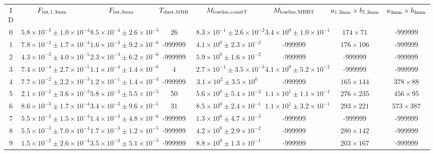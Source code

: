 \begin{table}
\begin{tabular}{cccccccc}
ID & $F_{\rm int, 1.3mm}$ & $F_{\rm int, 3mm}$ & $T_{\rm dust, MBB}$ & $M_{\rm lowlim, constT}$ & $M_{\rm lowlim, MBBT}$ & $a_{\rm 1.3mm}\times b_{\rm 1.3mm}$ & $a_{\rm 3mm}\times b_{\rm 3mm}$ \\
0 & $5.8\times10^{-3}\pm 1.0\times10^{-4}$ & $8.5\times10^{-4}\pm 2.6\times10^{-5}$ & 26 & $8.3\times10^{-1}\pm 2.6\times10^{-2}$ & $3.4\times10^{0}\pm 1.0\times10^{-1}$ & $174\times 71$ & -999999 \\
1 & $7.8\times10^{-3}\pm 1.7\times10^{-4}$ & $1.6\times10^{-3}\pm 9.2\times10^{-6}$ & -999999 & $4.1\times10^{0}\pm 2.3\times10^{-2}$ & -999999 & $176\times 106$ & -999999 \\
2 & $4.3\times10^{-3}\pm 4.0\times10^{-5}$ & $2.3\times10^{-3}\pm 6.2\times10^{-6}$ & -999999 & $5.9\times10^{0}\pm 1.6\times10^{-2}$ & -999999 & -999999 & -999999 \\
3 & $7.4\times10^{-4}\pm 2.7\times10^{-5}$ & $1.1\times10^{-4}\pm 1.4\times10^{-6}$ & 4 & $2.7\times10^{-1}\pm 3.5\times10^{-3}$ & $4.1\times10^{0}\pm 5.2\times10^{-2}$ & -999999 & -999999 \\
4 & $7.7\times10^{-2}\pm 2.2\times10^{-3}$ & $1.2\times10^{-1}\pm 1.4\times10^{-3}$ & -999999 & $3.1\times10^{2}\pm 3.5\times10^{0}$ & -999999 & $165\times 144$ & $378\times 88$ \\
5 & $2.1\times10^{-2}\pm 3.6\times10^{-3}$ & $5.8\times10^{-3}\pm 5.5\times10^{-5}$ & 50 & $5.6\times10^{0}\pm 5.4\times10^{-2}$ & $1.1\times10^{1}\pm 1.1\times10^{-1}$ & $276\times 235$ & $456\times 95$ \\
6 & $8.6\times10^{-3}\pm 1.7\times10^{-4}$ & $3.4\times10^{-3}\pm 9.6\times10^{-5}$ & 31 & $8.5\times10^{0}\pm 2.4\times10^{-1}$ & $1.1\times10^{1}\pm 3.2\times10^{-1}$ & $293\times 221$ & $573\times 387$ \\
7 & $5.5\times10^{-3}\pm 1.5\times10^{-4}$ & $1.4\times10^{-3}\pm 4.8\times10^{-6}$ & -999999 & $1.3\times10^{0}\pm 4.7\times10^{-3}$ & -999999 & -999999 & -999999 \\
8 & $5.5\times10^{-3}\pm 7.0\times10^{-4}$ & $1.7\times10^{-3}\pm 1.2\times10^{-5}$ & -999999 & $4.2\times10^{0}\pm 2.9\times10^{-2}$ & -999999 & $280\times 142$ & -999999 \\
9 & $1.5\times10^{-2}\pm 2.6\times10^{-4}$ & $3.5\times10^{-3}\pm 5.1\times10^{-5}$ & -999999 & $8.8\times10^{0}\pm 1.3\times10^{-1}$ & -999999 & $203\times 167$ & -999999 \\

\end{tabular}
\end{table}
